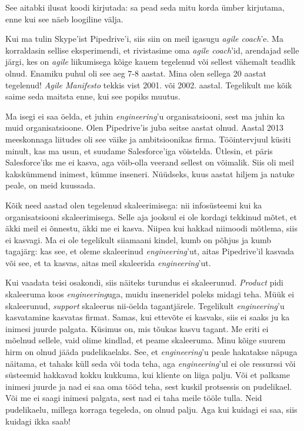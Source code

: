 See aitabki ilusat koodi kirjutada: sa 
pead seda mitu korda ümber kirjutama, enne kui see näeb loogiline välja.


Kui ma tulin Skype'ist Pipedrive'i, siis siin on meil 
igasugu \emph{agile coach}'e. Ma korraldasin sellise eksperimendi, et rivistasime oma 
\emph{agile coach}'id, arendajad selle järgi, kes on 
\emph{agile} liikumisega kõige kauem tegelenud või sellest vähemalt teadlik olnud. Enamiku puhul oli see aeg 7-8 aastat. Mina olen sellega 20 
aastat tegelenud! \emph{Agile Manifesto} tekkis vist 2001. või 
2002. aastal. Tegelikult me kõik saime seda maitsta enne, kui see popiks muutus.


Ma isegi ei saa öelda, et juhin \emph{engineering}'u 
organisatsiooni, sest ma juhin ka muid organisatsioone. Olen 
Pipedrive'is juba seitse aastat olnud. Aastal 
2013 meeskonnaga liitudes oli see väike ja ambitsioonikas firma. Tööintervjuul küsiti minult, kas ma usun, et suudame Salesforce'iga võistelda. Ütlesin, et päris 
Salesforce'iks me ei kasva, aga võib-olla veerand sellest on võimalik. Siis 
oli meil kakskümmend inimest, kümme inseneri. Nüüdseks, kuus aastat hiljem ja natuke peale, on meid kuussada.

Kõik need aastad olen tegelenud skaleerimisega: nii infosüsteemi kui ka 
organisatsiooni skaleerimisega. Selle aja jooksul ei ole kordagi tekkinud mõtet, et 
äkki meil ei õnnestu, äkki me ei kasva. Niipea kui hakkad niimoodi mõtlema, siis 
ei kasvagi. Ma ei ole tegelikult siiamaani kindel, kumb on põhjus ja 
kumb tagajärg: kas see, et oleme skaleerinud \emph{engineering}'ut, 
aitas Pipedrive'il kasvada või see, et ta kasvas, aitas meil skaleerida 
\emph{engineering}'ut.

Kui vaadata teisi osakondi, siis näiteks turundus ei skaleerunud. 
\emph{Product} pidi skaleeruma koos \emph{engineering}uga, muidu inseneridel 
poleks midagi teha. Müük ei skaleerunud, \emph{support} skaleerus 
nii-öelda tagantjärele. Tegelikult \emph{engineering}'u kasvatamine 
kasvatas firmat. Samas, kui ettevõte ei kasvaks, siis ei saaks ju ka 
inimesi juurde palgata. Küsimus on, 
mis tõukas kasvu tagant. Me eriti ei mõelnud sellele, vaid olime 
kindlad, et peame skaleeruma. Minu kõige suurem hirm on olnud jääda pudelikaelaks. See, et \emph{engineering}'u peale hakatakse 
näpuga näitama, et tahaks küll seda või toda teha, aga 
\emph{engineering}'ul ei ole ressurssi või süsteemid hakkavad 
kokku kukkuma, kui kliente on liiga palju. Või et palkame inimesi juurde ja 
nad ei saa oma tööd teha, sest kuskil protsessis on pudelikael. 
Või me ei saagi inimesi palgata, sest nad ei taha meile tööle tulla. Neid 
pudelikaelu, millega korraga tegeleda, on olnud palju. Aga kui kuidagi ei saa, siis kuidagi ikka saab!
